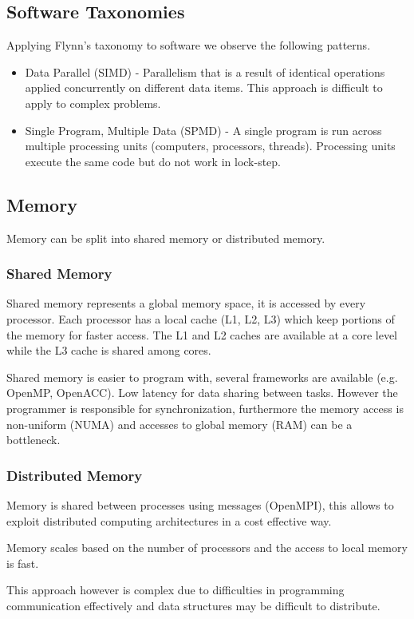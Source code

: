 \subsection{Software Taxonomies}

Applying Flynn's taxonomy to software we observe the following patterns.

\begin{itemize}
    \item Data Parallel (SIMD) - Parallelism that is a result of identical operations applied concurrently on different data items. This approach is difficult to apply to complex problems.
    \item Single Program, Multiple Data (SPMD) - A single program is run across multiple processing units (computers, processors, threads). Processing units execute the same code but do not work in lock-step.
\end{itemize}

\subsection{Memory}

Memory can be split into shared memory or distributed memory.

\subsubsection{Shared Memory}

Shared memory represents a global memory space, it is accessed by every processor.
Each processor has a local cache (L1, L2, L3) which keep portions of the memory for faster access.
The L1 and L2 caches are available at a core level while the L3 cache is shared among cores.

Shared memory is easier to program with, several frameworks are available (e.g. OpenMP, OpenACC).
Low latency for data sharing between tasks.
However the programmer is responsible for synchronization, furthermore the memory access is non-uniform (NUMA) and accesses to global memory (RAM) can be a bottleneck.

\subsubsection{Distributed Memory}

Memory is shared between processes using messages (OpenMPI), this allows to exploit distributed computing architectures in a cost effective way.

Memory scales based on the number of processors and the access to local memory is fast.

This approach however is complex due to difficulties in programming communication effectively and data structures may be difficult to distribute.